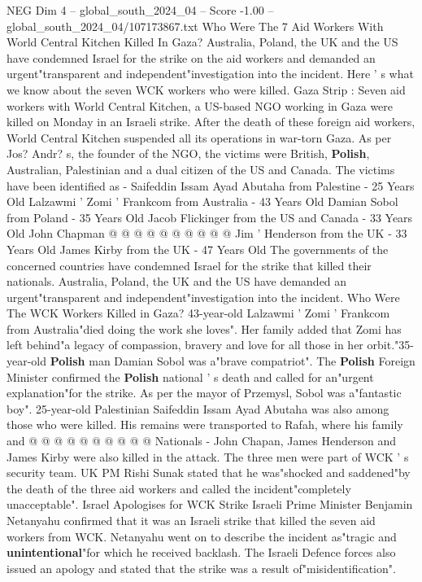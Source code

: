 \begin{textsample}{NEG Dim 4 – global\_south\_2024\_04 – Score -1.00 – global\_south\_2024\_04/107173867.txt}  \label{ex:f4_neg_194}
Who Were The 7 Aid Workers With World Central Kitchen Killed In Gaza?
Australia, Poland, the UK and the US have condemned Israel for the strike on the aid workers and demanded an urgent"transparent and independent"investigation into the incident.
Here ' s what we know about the seven WCK workers who were killed.
Gaza Strip : Seven aid workers with World Central Kitchen, a US-based NGO working in Gaza were killed on Monday in an Israeli strike.
After the death of these foreign aid workers, World Central Kitchen suspended all its operations in war-torn Gaza.
As per Jos?
Andr? s, the founder of the NGO, the victims were British, \textbf{Polish}, Australian, Palestinian and a dual citizen of the US and Canada.
The victims have been identified as - Saifeddin Issam Ayad Abutaha from Palestine - 25 Years Old Lalzawmi ' Zomi ' Frankcom from Australia - 43 Years Old Damian Sobol from Poland - 35 Years Old Jacob Flickinger from the US and Canada - 33 Years Old John Chapman @ @ @ @ @ @ @ @ @ @ Jim ' Henderson from the UK - 33 Years Old James Kirby from the UK - 47 Years Old The governments of the concerned countries have condemned Israel for the strike that killed their nationals.
Australia, Poland, the UK and the US have demanded an urgent"transparent and independent"investigation into the incident.
Who Were The WCK Workers Killed in Gaza? 43-year-old Lalzawmi ' Zomi ' Frankcom from Australia"died doing the work she loves".
Her family added that Zomi has left behind"a legacy of compassion, bravery and love for all those in her orbit."35-year-old \textbf{Polish} man Damian Sobol was a"brave compatriot".
The \textbf{Polish} Foreign Minister confirmed the \textbf{Polish} national ' s death and called for an"urgent explanation"for the strike.
As per the mayor of Przemysl, Sobol was a"fantastic boy". 25-year-old Palestinian Saifeddin Issam Ayad Abutaha was also among those who were killed.
His remains were transported to Rafah, where his family and @ @ @ @ @ @ @ @ @ @ Nationals - John Chapan, James Henderson and James Kirby were also killed in the attack.
The three men were part of WCK ' s security team.
UK PM Rishi Sunak stated that he was"shocked and saddened"by the death of the three aid workers and called the incident"completely unacceptable".
Israel Apologises for WCK Strike Israeli Prime Minister Benjamin Netanyahu confirmed that it was an Israeli strike that killed the seven aid workers from WCK.
Netanyahu went on to describe the incident as"tragic and \textbf{unintentional}"for which he received backlash.
The Israeli Defence forces also issued an apology and stated that the strike was a result of"misidentification".

\end{textsample}
